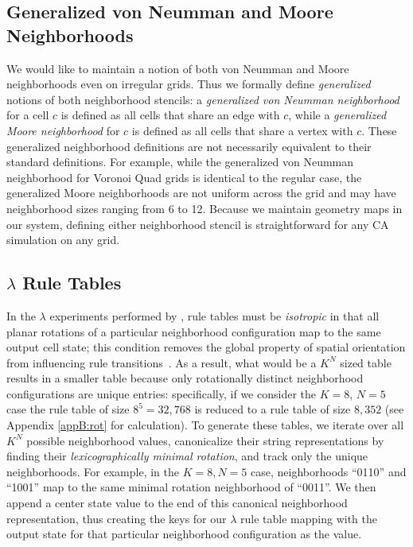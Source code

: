 \documentclass[a4paper,11pt]{report}
\begin{document}
\subsection{Generalized von Neumman and Moore Neighborhoods}
We would like to maintain a notion of both von Neumman and Moore neighborhoods even on irregular grids. Thus we formally define \textit{generalized} notions of both neighborhood stencils: a \textit{generalized von Neumman neighborhood} for a cell $c$ is defined as all cells that share an edge with $c$, while a \textit{generalized Moore neighborhood} for $c$ is defined as all cells that share a vertex with $c$. These generalized neighborhood definitions are not necessarily equivalent to their standard definitions. For example, while the generalized von Neumman neighborhood for Voronoi Quad grids is identical to the regular case, the generalized Moore neighborhoods are not uniform across the grid and may have neighborhood sizes ranging from 6 to 12. Because we maintain geometry maps in our system, defining either neighborhood stencil is straightforward for any CA simulation on any grid.

\subsection{$\lambda$ Rule Tables}
In the $\lambda$ experiments performed by \citeauthor{wo90}, rule tables must be \textit{isotropic} in that all planar rotations of a particular neighborhood configuration map to the same output cell state; this condition removes the global property of spatial orientation from influencing rule transitions~\cite{av00,wo90}. As a result, what would be a $K^N$ sized table results in a smaller table because only rotationally distinct neighborhood configurations are unique entries: specifically, if we consider the $K=8$, $N=5$ case the rule table of size $8^5 = 32,768$ is reduced to a rule table of size $8,352$ (see Appendix \ref{appB:rot} for calculation). To generate these tables, we iterate over all $K^N$ possible neighborhood values, canonicalize their string representations by finding their \textit{lexicographically minimal rotation}, and track only the unique neighborhoods. For example, in the $K=8, N=5$ case, neighborhoods ``0110'' and ``1001'' map to the same minimal rotation neighborhood of ``0011''. We then append a center state value to the end of this canonical neighborhood representation, thus creating the keys for our $\lambda$ rule table mapping with the output state for that particular neighborhood configuration as the value.
\end{document}
